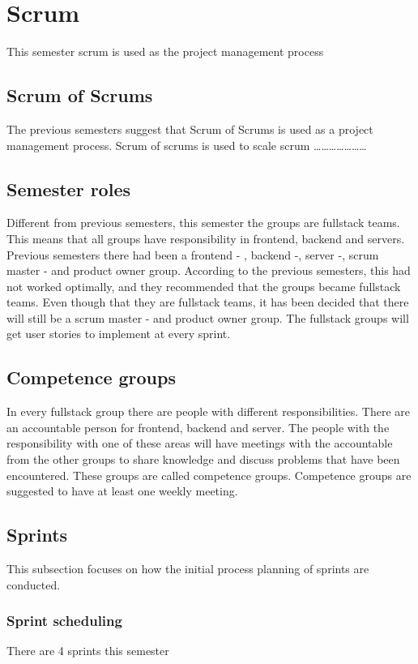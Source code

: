 \section{Scrum}
This semester scrum is used as the project management process

\subsection{Scrum of Scrums}
The previous semesters suggest that Scrum of Scrums is used as a project management process. Scrum of scrums is used to scale scrum …………………

\subsection{Semester roles}
Different from previous semesters, this semester the groups are fullstack teams. This means that all groups have responsibility in frontend, backend and servers.
Previous semesters there had been a frontend - , backend -, server -, scrum master - and product owner group. 
According to the previous semesters, this had not worked optimally, and they recommended that the groups became fullstack teams.
Even though that they are fullstack teams, it has been decided that there will still be a scrum master - and product owner group. 
The fullstack groups will get user stories to implement at every sprint.

\subsection{Competence groups}
In every fullstack group there are people with different responsibilities.
There are an accountable person for frontend, backend and server.
The people with the responsibility with one of these areas will have meetings with the accountable from the other groups to share knowledge and discuss problems that have been encountered.
These groups are called competence groups.
Competence groups are suggested to have at least one weekly meeting.

\subsection{Sprints}
This subsection focuses on how the initial process planning of sprints are conducted. 

\subsubsection{Sprint scheduling}
There are 4 sprints this semester

